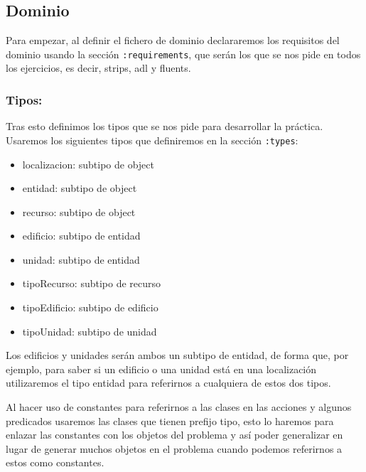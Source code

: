 \documentclass[10pt, spanish]{article}
\begin{document}
\subsection{Dominio}

Para empezar, al definir el fichero de dominio declararemos los requisitos del dominio usando la sección \texttt{:requirements}, que serán los que se nos pide en todos los ejercicios, es decir, strips, adl y fluents.

\subsubsection{Tipos:}

Tras esto definimos los tipos que se nos pide para desarrollar la práctica. Usaremos los siguientes tipos que definiremos en la sección \texttt{:types}:

\begin{multicols}{2}
\begin{itemize}
  \setlength{\parskip}{0pt}
  	\item localizacion: subtipo de object
	\item entidad: subtipo de object
	\item recurso: subtipo de object
	\item edificio: subtipo de entidad
\end{itemize}


\begin{itemize}
  \setlength{\parskip}{0pt}
	\item unidad: subtipo de entidad
	\item tipoRecurso: subtipo de recurso
	\item tipoEdificio: subtipo de edificio
	\item tipoUnidad: subtipo de unidad
\end{itemize}
\end{multicols}

Los edificios y unidades serán ambos un subtipo de entidad, de forma que, por ejemplo, para saber si un edificio o una unidad está en una localización utilizaremos el tipo entidad para referirnos a cualquiera de estos dos tipos.

Al hacer uso de constantes para referirnos a las clases en las acciones y algunos predicados usaremos las clases que tienen prefijo tipo, esto lo haremos para enlazar las constantes con los objetos del problema y así poder generalizar en lugar de generar muchos objetos en el problema cuando podemos referirnos a estos como constantes.
\end{document}
